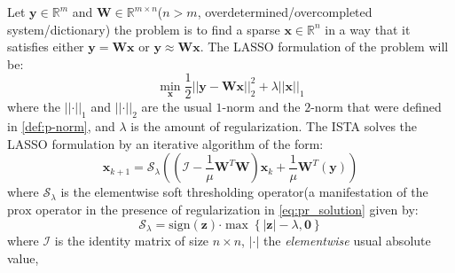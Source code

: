 Let $\boldsymbol{y} \in \mathbb{R}^m$ and $\boldsymbol{W} \in \mathbb{R}^{m \times n}$($n > m$, overdetermined/overcompleted system/dictionary)
the \srp\index{\srp} problem is to find a sparse $\boldsymbol{x} \in \mathbb{R}^n$ in a way that it satisfies either $\boldsymbol{y} = \boldsymbol{W}\boldsymbol{x}$ or $\boldsymbol{y} \approx \boldsymbol{W}\boldsymbol{x}$.
The \ac{LASSO}\cite{Hastie2009} formulation of the problem will be:
\begin{equation*}
  \min_{\boldsymbol{x}} \frac{1}{2} \left|\left|\boldsymbol{y}-\boldsymbol{W}\boldsymbol{x}\right|\right|_2^2 + \lambda \left|\left|\boldsymbol{x}\right|\right|_1
\end{equation*}
where the $\left|\left|\boldsymbol{\cdot}\right|\right|_1$ and $\left|\left|\boldsymbol{\cdot}\right|\right|_2$ are the usual $1$-norm and the $2$-norm that were defined in \cref{def:p-norm}, and $\lambda$ is the amount of regularization\cite{Hastie2009}. 
The \ac{ISTA}\cite{Daubechies2003} solves the \ac{LASSO}\cite{Hastie2009} formulation by an iterative algorithm of the form:
\begin{equation*}
  \boldsymbol{x}_{k+1} = \mathcal{S}_\lambda\left(\left(\mathcal{I}-\frac{1}{\mu}\boldsymbol{W}^T\boldsymbol{W}\right)\boldsymbol{x}_k+\frac{1}{\mu}\boldsymbol{W}^T\left(\boldsymbol{y}\right)\right)
\end{equation*}
where $\mathcal{S}_\lambda$ is the elementwise soft thresholding operator(a manifestation of the $\mathrm{prox}$ operator  in the presence of regularization in \cref{eq:pr_solution} given by:
\begin{equation*}
  \mathcal{S}_\lambda = \mathrm{sign}(\boldsymbol{z}) \boldsymbol{\cdot} \max \left\{\left|\boldsymbol{z}\right|-\lambda,\boldsymbol{0}\right\}
\end{equation*}
where $\mathcal{I}$ is the identity matrix of size $n \times n$, $\left|\boldsymbol{\cdot}\right|$ the \emph{elementwise} usual absolute value, 
